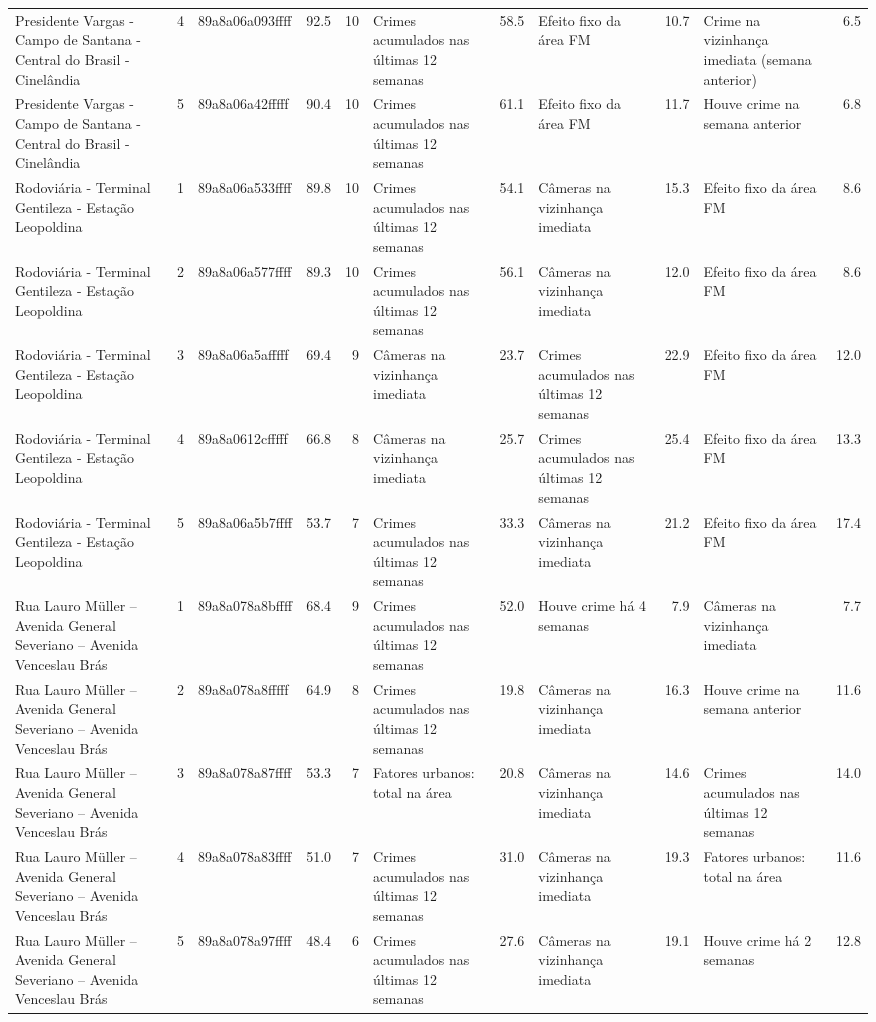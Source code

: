 \begin{tabular}{lrlrrlrlrlr}
Presidente Vargas - Campo de Santana - Central do Brasil - Cinelândia & 4 & 89a8a06a093ffff & 92.5 & 10 & Crimes acumulados nas últimas 12 semanas & 58.5 & Efeito fixo da área FM & 10.7 & Crime na vizinhança imediata (semana anterior) & 6.5 \\
Presidente Vargas - Campo de Santana - Central do Brasil - Cinelândia & 5 & 89a8a06a42fffff & 90.4 & 10 & Crimes acumulados nas últimas 12 semanas & 61.1 & Efeito fixo da área FM & 11.7 & Houve crime na semana anterior & 6.8 \\
Rodoviária - Terminal Gentileza - Estação Leopoldina & 1 & 89a8a06a533ffff & 89.8 & 10 & Crimes acumulados nas últimas 12 semanas & 54.1 & Câmeras na vizinhança imediata & 15.3 & Efeito fixo da área FM & 8.6 \\
Rodoviária - Terminal Gentileza - Estação Leopoldina & 2 & 89a8a06a577ffff & 89.3 & 10 & Crimes acumulados nas últimas 12 semanas & 56.1 & Câmeras na vizinhança imediata & 12.0 & Efeito fixo da área FM & 8.6 \\
Rodoviária - Terminal Gentileza - Estação Leopoldina & 3 & 89a8a06a5afffff & 69.4 & 9 & Câmeras na vizinhança imediata & 23.7 & Crimes acumulados nas últimas 12 semanas & 22.9 & Efeito fixo da área FM & 12.0 \\
Rodoviária - Terminal Gentileza - Estação Leopoldina & 4 & 89a8a0612cfffff & 66.8 & 8 & Câmeras na vizinhança imediata & 25.7 & Crimes acumulados nas últimas 12 semanas & 25.4 & Efeito fixo da área FM & 13.3 \\
Rodoviária - Terminal Gentileza - Estação Leopoldina & 5 & 89a8a06a5b7ffff & 53.7 & 7 & Crimes acumulados nas últimas 12 semanas & 33.3 & Câmeras na vizinhança imediata & 21.2 & Efeito fixo da área FM & 17.4 \\
Rua Lauro Müller – Avenida General Severiano – Avenida Venceslau Brás & 1 & 89a8a078a8bffff & 68.4 & 9 & Crimes acumulados nas últimas 12 semanas & 52.0 & Houve crime há 4 semanas & 7.9 & Câmeras na vizinhança imediata & 7.7 \\
Rua Lauro Müller – Avenida General Severiano – Avenida Venceslau Brás & 2 & 89a8a078a8fffff & 64.9 & 8 & Crimes acumulados nas últimas 12 semanas & 19.8 & Câmeras na vizinhança imediata & 16.3 & Houve crime na semana anterior & 11.6 \\
Rua Lauro Müller – Avenida General Severiano – Avenida Venceslau Brás & 3 & 89a8a078a87ffff & 53.3 & 7 & Fatores urbanos: total na área & 20.8 & Câmeras na vizinhança imediata & 14.6 & Crimes acumulados nas últimas 12 semanas & 14.0 \\
Rua Lauro Müller – Avenida General Severiano – Avenida Venceslau Brás & 4 & 89a8a078a83ffff & 51.0 & 7 & Crimes acumulados nas últimas 12 semanas & 31.0 & Câmeras na vizinhança imediata & 19.3 & Fatores urbanos: total na área & 11.6 \\
Rua Lauro Müller – Avenida General Severiano – Avenida Venceslau Brás & 5 & 89a8a078a97ffff & 48.4 & 6 & Crimes acumulados nas últimas 12 semanas & 27.6 & Câmeras na vizinhança imediata & 19.1 & Houve crime há 2 semanas & 12.8 \\
\bottomrule
\end{tabular}
